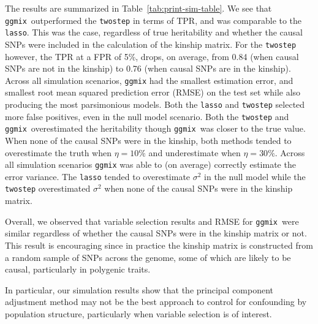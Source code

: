 \documentclass[12pt,letter]{article}\usepackage[]{graphicx}\usepackage[]{color}
\newcommand{\ggmix}{\texttt{ggmix}}
\begin{document}
The results are summarized in Table~\ref{tab:print-sim-table}. We see that \ggmix ~outperformed the \texttt{twostep} in terms of TPR, and was comparable to the \texttt{lasso}. This was the case, regardless of true heritability and whether the causal SNPs were included in the calculation of the kinship matrix. For the \texttt{twostep} however, the TPR at a FPR of 5\%, drops, on average, from 0.84 (when causal SNPs are not in the kinship) to 0.76 (when causal SNPs are in the kinship). Across all simulation scenarios, \texttt{ggmix} had the smallest estimation error, and smallest root mean squared prediction error (RMSE) on the test set while also producing the most parsimonious models. Both the \texttt{lasso} and \texttt{twostep} selected more false positives, even in the null model scenario. Both the \texttt{twostep} and \ggmix ~overestimated the heritability though \ggmix ~was closer to the true value. When none of the causal SNPs were in the kinship, both methods tended to overestimate the truth when $\eta=10\%$ and underestimate when $\eta=30\%$. Across all simulation scenarios \texttt{ggmix} was able to (on average) correctly estimate the error variance. The \texttt{lasso} tended to overestimate $\sigma^2$ in the null model while the \texttt{twostep} overestimated $\sigma^2$ when none of the causal SNPs were in the kinship matrix. 

Overall, we observed that variable selection results and RMSE for \ggmix ~were similar regardless of whether the causal SNPs were in the kinship matrix or not.
This result is encouraging since in practice the kinship matrix is constructed from a random sample of SNPs across the genome, some of which are likely to be causal, particularly in polygenic traits. %




In particular, our simulation results show that the principal component adjustment method may not be the best approach to control for confounding by population structure, particularly when variable selection is of interest. 


\end{document}
